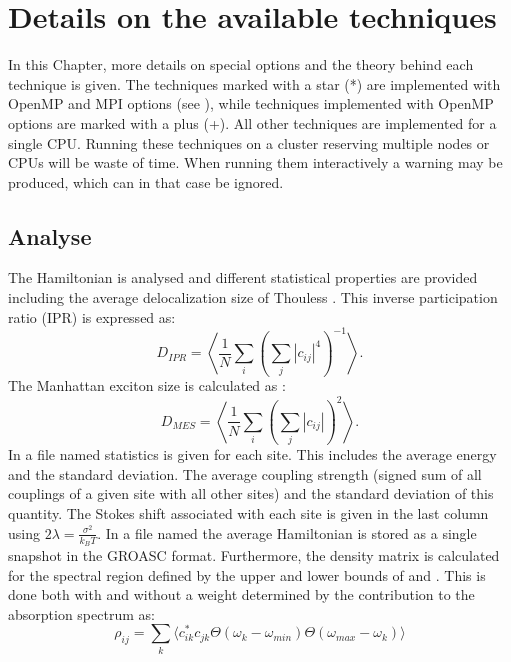 \chapter{\label{chap:techniques}Details on the available techniques}
In this Chapter, more details on special options and the theory behind each technique is given.
The techniques marked with a star (*) are implemented with OpenMP and MPI options (see \cite{Sardjan_2020}), while techniques implemented with OpenMP options are marked with a plus (+).
All other techniques are implemented for a single CPU.
Running these techniques on a cluster reserving multiple nodes or CPUs will be waste of time.
When running them interactively a warning may be produced, which can in that case be ignored.

\section{Analyse}
The Hamiltonian is analysed and different statistical properties are provided including the average delocalization size of Thouless \cite{Thouless.1974.PR.13.93}.
This inverse participation ratio (IPR) is expressed as:
\begin{equation}
	D_{IPR}=\left\langle\frac{1}{N}\sum_i\left(\sum_j |c_{ij}|^{4}\right)^{-1}\right\rangle.
\end{equation}
The Manhattan exciton size is calculated as \cite{Jansen.2025.J.Chem.Phys..162.074113}:
\begin{equation}
	D_{MES}=\left\langle\frac{1}{N}\sum_i\left(\sum_j |c_{ij}|\right)^{2}\right\rangle.
\end{equation}
In a file named  statistics is given for each site.
This includes the average energy and the standard deviation.
The average coupling strength (signed sum of all couplings of a given site with all other sites) and the standard deviation of this quantity.
The Stokes shift associated with each site is given in the last column using $2\lambda=\frac{\sigma^2}{k_BT}$.
In a file named  the average Hamiltonian is stored as a single snapshot in the GROASC format.
Furthermore, the density matrix is calculated for the spectral region defined by the upper and lower bounds of  and .
This is done both with and without a weight determined by the contribution to the absorption spectrum as:
\begin{equation}
\rho_{ij}=\sum_k \Big\langle c_{ik}^* c_{jk}  \Theta(\omega_{k}-\omega_{min})\Theta(\omega_{max}-\omega_k)\Big\rangle
\end{equation}
